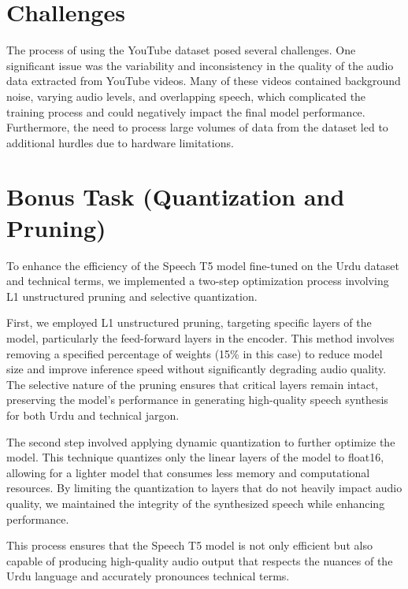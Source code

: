 \documentclass[conference]{IEEEtran}
\begin{document}
\section{Challenges}
The process of using the YouTube dataset posed several challenges. One significant issue was the variability and inconsistency in the quality of the audio data extracted from YouTube videos. Many of these videos contained background noise, varying audio levels, and overlapping speech, which complicated the training process and could negatively impact the final model performance. Furthermore, the need to process large volumes of data from the dataset led to additional hurdles due to hardware limitations. 

\section{Bonus Task (Quantization and Pruning)}
To enhance the efficiency of the Speech T5 model fine-tuned on the Urdu dataset and technical terms, we implemented a two-step optimization process involving L1 unstructured pruning and selective quantization.

First, we employed L1 unstructured pruning, targeting specific layers of the model, particularly the feed-forward layers in the encoder. This method involves removing a specified percentage of weights (15\% in this case) to reduce model size and improve inference speed without significantly degrading audio quality. The selective nature of the pruning ensures that critical layers remain intact, preserving the model's performance in generating high-quality speech synthesis for both Urdu and technical jargon.

The second step involved applying dynamic quantization to further optimize the model. This technique quantizes only the linear layers of the model to float16, allowing for a lighter model that consumes less memory and computational resources. By limiting the quantization to layers that do not heavily impact audio quality, we maintained the integrity of the synthesized speech while enhancing performance.

 This process ensures that the Speech T5 model is not only efficient but also capable of producing high-quality audio output that respects the nuances of the Urdu language and accurately pronounces technical terms.
 
\end{document}
